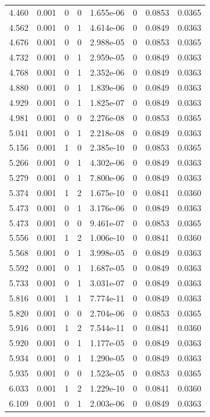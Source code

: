\documentclass[preview]{standalone}
\begin{document}
{{{\begin{tabular}{L{1.2cm}C{1.2cm} C{0.3cm}C{0.5cm} C{1.4cm}C{1.4cm} C{1.4cm}C{1.4cm}}
  4.460  &  0.001  & 0     &  0 &  1.655e-06  & 0  & 0.0853 &  0.0365   \\ 
  4.562  &  0.001  & 0     &  1 &  4.614e-06  & 0  & 0.0849 &  0.0363   \\ 
  4.676  &  0.001  & 0     &  0 &  2.988e-05  & 0  & 0.0853 &  0.0365   \\ 
  4.732  &  0.001  & 0     &  1 &  2.959e-05  & 0  & 0.0849 &  0.0363   \\ 
  4.768  &  0.001  & 0     &  1 &  2.352e-06  & 0  & 0.0849 &  0.0363   \\ 
  4.880  &  0.001  & 0     &  1 &  1.839e-06  & 0  & 0.0849 &  0.0363   \\ 
  4.929  &  0.001  & 0     &  1 &  1.825e-07  & 0  & 0.0849 &  0.0363   \\ 
  4.981  &  0.001  & 0     &  0 &  2.276e-08  & 0  & 0.0853 &  0.0365   \\ 
  5.041  &  0.001  & 0     &  1 &  2.218e-08  & 0  & 0.0849 &  0.0363   \\ 
  5.156  &  0.001  & 1     &  0 &  2.385e-10  & 0  & 0.0853 &  0.0365   \\ 
  5.266  &  0.001  & 0     &  1 &  4.302e-06  & 0  & 0.0849 &  0.0363   \\ 
  5.279  &  0.001  & 0     &  1 &  7.800e-06  & 0  & 0.0849 &  0.0363   \\ 
  5.374  &  0.001  & 1     &  2 &  1.675e-10  & 0  & 0.0841 &  0.0360   \\ 
  5.473  &  0.001  & 0     &  1 &  3.176e-06  & 0  & 0.0849 &  0.0363   \\ 
  5.473  &  0.001  & 0     &  0 &  9.461e-07  & 0  & 0.0853 &  0.0365   \\ 
  5.556  &  0.001  & 1     &  2 &  1.006e-10  & 0  & 0.0841 &  0.0360   \\ 
  5.568  &  0.001  & 0     &  1 &  3.998e-05  & 0  & 0.0849 &  0.0363   \\ 
  5.592  &  0.001  & 0     &  1 &  1.687e-05  & 0  & 0.0849 &  0.0363   \\ 
  5.733  &  0.001  & 0     &  1 &  3.031e-07  & 0  & 0.0849 &  0.0363   \\ 
  5.816  &  0.001  & 1     &  1 &  7.774e-11  & 0  & 0.0849 &  0.0363   \\ 
  5.820  &  0.001  & 0     &  0 &  2.704e-06  & 0  & 0.0853 &  0.0365   \\ 
  5.916  &  0.001  & 1     &  2 &  7.544e-11  & 0  & 0.0841 &  0.0360   \\ 
  5.920  &  0.001  & 0     &  1 &  1.177e-05  & 0  & 0.0849 &  0.0363   \\ 
  5.934  &  0.001  & 0     &  1 &  1.290e-05  & 0  & 0.0849 &  0.0363   \\ 
  5.935  &  0.001  & 0     &  0 &  1.523e-05  & 0  & 0.0853 &  0.0365   \\ 
  6.033  &  0.001  & 1     &  2 &  1.229e-10  & 0  & 0.0841 &  0.0360   \\ 
  6.109  &  0.001  & 0     &  1 &  2.003e-06  & 0  & 0.0849 &  0.0363   \\ 
\hline 
\end{tabular} 

}}}
\end{document}
